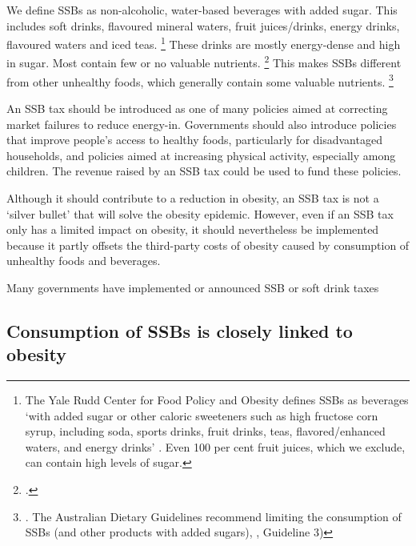 \documentclass[embargoed]{grattan}
\begin{document}
We define SSBs as non-alcoholic, water-based beverages with added sugar.
This includes soft drinks, flavoured mineral waters, fruit juices/drinks, energy drinks, flavoured waters and iced teas.%
\footnote{The Yale Rudd Center for Food Policy and Obesity defines SSBs as beverages `with added sugar or other caloric sweeteners such as high fructose corn syrup, including soda, sports drinks, fruit drinks, teas, flavored/enhanced waters, and energy drinks' \textcite{Friedman2012Sugarsweetenedbeverage}.
Even 100 per cent fruit juices, which we exclude, can contain high levels of sugar.} These drinks are mostly energy-dense and high in sugar.
Most contain few or no valuable nutrients.%
\footcites{Kaplin2013Usingeconomicpolicy}{Mozaffarian2016politicssciencesoda} This makes SSBs different from other unhealthy foods, which generally contain some valuable nutrients.%
\footnote{\textcite{LordanShouldweput}.
The Australian Dietary Guidelines recommend limiting the consumption of SSBs (and other products with added sugars), \textcite{Health2013AustralianDietaryGuidelines}, Guideline 3)}

An SSB tax should be introduced as one of many policies aimed at correcting market failures to reduce energy-in.
Governments should also introduce policies that improve people's access to healthy foods, particularly for disadvantaged households, and policies aimed at increasing physical activity, especially among children.
The revenue raised by an SSB tax could be used to fund these policies.

Although it should contribute to a reduction in obesity, an SSB tax is not a `silver bullet' that will solve the obesity epidemic.
However, even if an SSB tax only has a limited impact on obesity, it should nevertheless be implemented because it partly offsets the third-party costs of obesity caused by consumption of unhealthy foods and beverages.

\begin{table}
\caption{Many governments have implemented or announced SSB or soft drink taxes}




\end{table}

\subsection{Consumption of SSBs is closely linked to obesity}\label{consumption-of-ssbs-is-closely-linked-to-obesity}
\end{document}
